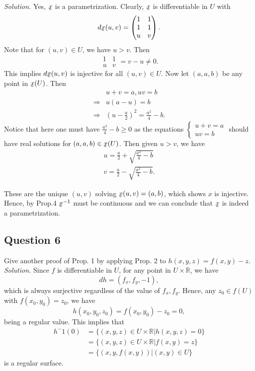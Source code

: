 \documentclass[12pt]{article}
\begin{document}
\textit{Solution.} Yes, $\underaccent{\tilde}{x}$ is a parametrization. Clearly, $\underaccent{\tilde}{x}$ is differentiable in $U$ with \begin{equation*}
    d\underaccent{\tilde}{x}(u,v) =\begin{pmatrix}
    1&1\\
    1&1\\
    u&v\\
    \end{pmatrix}.
\end{equation*}
Note that for $(u,v)\in U$, we have $u>v$. Then $$\begin{array}{|cc|}
     1&1  \\
     u&v 
\end{array} = v - u \neq 0.$$
This implies $d\underaccent{\tilde}{x}(u,v)$ is injective for all $(u,v)\in U$. Now let $(a,a,b)$ be any point in $\underaccent{\tilde}{x}(U)$. Then \begin{align*}
    &u+v=a,uv=b\\
    \Rightarrow &u(a-u)=b\\
    \Rightarrow &(u-\frac{a}{2})^2 = \frac{a^2}{4}-b.
\end{align*}
Notice that here one must have $\frac{a^2}{4}-b \geq 0$ as the equations $\begin{cases} u+v=a\\
uv=b
\end{cases}$ should have real solutions for $(a,a,b)\in \underaccent{\tilde}{x}(U)$. Then given $u>v$, we have \begin{align*}
    u = \frac{a}{2}+\sqrt{\frac{a^2}{4}-b}\\
    v = \frac{a}{2}-\sqrt{\frac{a^2}{4}-b}.
\end{align*}

These are the unique $(u,v)$ solving $\underaccent{\tilde}{x}(u,v)=(a,b)$, which shows $x$ is injective. Hence, by Prop.4 $\underaccent{\tilde}{x}^{-1}$ must be continuous and we can conclude that $\underaccent{\tilde}{x}$ is indeed a parametrization.

\subsection*{Question 6}
Give another proof of Prop. 1 by applying Prop. 2 to $h(x,y,z)=f(x,y)-z$.\\

\textit{Solution.}
Since $f$ is differentiable in $U$, for any point in $U \times \mathbb{R}$, we have \begin{equation*}
    dh = (f_x,f_y,-1),
\end{equation*}
which is always surjective regardless of the value of $f_x,f_y$. Hence, any $z_0 \in f(U)$ with $f(x_0,y_0) = z_0$, we have \begin{equation*}
    h(x_0,y_0,z_0) = f(x_0,y_0) - z_0 = 0,
\end{equation*}
being a regular value. This implies that \begin{align*}
    h^-1(0) &= \{(x,y,z)\in U\times \mathbb{R}|h(x,y,z)=0\}\\
    &=\{(x,y,z)\in U\times \mathbb{R}|f(x,y)=z\}\\
    &=\{(x,y,f(x,y))|(x,y)\in U\}
\end{align*}
is a regular surface.
\end{document}
